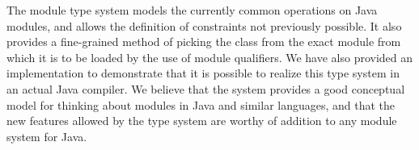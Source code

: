 The module type system models the currently common operations
on Java modules, and allows the definition of constraints
not previously possible. It also provides a fine-grained
method of picking the class from the exact module from which
it is to be loaded by the use of module qualifiers. We have
also provided an implementation to demonstrate that it is
possible to realize this type system in an actual Java compiler.
We believe that the system provides a good conceptual
model for thinking about modules in Java and similar languages,
and that the new features allowed by the type system are worthy
of addition to any module system for Java.